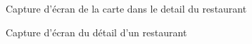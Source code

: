 \begin{figure}[H]
    \label{fig-detail-carte}
    \noindent{}
    \caption{Capture d'écran de la carte dans le detail du restaurant}
\end{figure}

\begin{figure}[H]
    \label{fig-detail-restaurant}
    \noindent{}
    \caption{Capture d'écran du détail d'un restaurant}
\end{figure}

